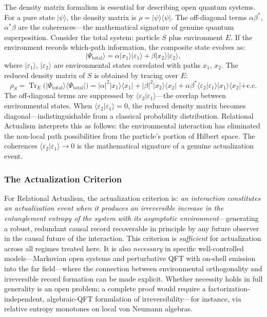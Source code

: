 \documentclass[11pt,a4paper]{article}
\theoremstyle{plain}
\theoremstyle{definition}
\theoremstyle{remark}
\newcommand{\ket}[1]{|#1\rangle}
\newcommand{\bra}[1]{\langle #1|}
\newcommand{\braket}[2]{\langle #1 | #2 \rangle}
\newcommand{\rhoS}{\rho_{S}}
\begin{document}
The density matrix formalism is essential for describing open quantum systems. For
a pure state $\ket{\psi}$, the density matrix is $\rho = \ket{\psi}\!\bra{\psi}$.
The off-diagonal terms $\alpha\beta^{*}$, $\alpha^{*}\beta$ are the
coherences---the mathematical signature of genuine quantum superposition. Consider
the total system: particle $S$ plus environment $E$. If the environment records
which-path information, the composite state evolves as:
\begin{equation}
  \ket{\Psi_{\mathrm{total}}} = \alpha\ket{x_1}\ket{\varepsilon_1}
  + \beta\ket{x_2}\ket{\varepsilon_2},
\end{equation}
where $\ket{\varepsilon_1}$, $\ket{\varepsilon_2}$ are environmental states
correlated with paths $x_1$, $x_2$. The reduced density matrix of $S$ is obtained
by tracing over $E$:
\begin{equation}
  \rhoS = \operatorname{Tr}_{E}\!\bigl(\ket{\Psi_{\mathrm{total}}}\!
           \bra{\Psi_{\mathrm{total}}}\bigr)
  = |\alpha|^2\ket{x_1}\!\bra{x_1}
  + |\beta|^2\ket{x_2}\!\bra{x_2}
  + \alpha\beta^{*}\braket{\varepsilon_2}{\varepsilon_1}\ket{x_1}\!\bra{x_2}
  + \mathrm{c.c.}
\end{equation}
The off-diagonal terms are suppressed by $\braket{\varepsilon_2}{\varepsilon_1}$---the
overlap between environmental states. When $\braket{\varepsilon_2}{\varepsilon_1}
= 0$, the reduced density matrix becomes diagonal---indistinguishable from a
classical probability distribution. Relational Actualism interprets this as
follows: the environmental interaction has eliminated the non-local path
possibilities from the particle's portion of Hilbert space. The coherences
$\braket{\varepsilon_2}{\varepsilon_1} \to 0$ is the mathematical signature of a
genuine actualization event.

\subsubsection{The Actualization Criterion}
\label{sec:criterion}

For Relational Actualism, the actualization criterion is: \emph{an interaction
constitutes an actualization event when it produces an irreversible increase in
the entanglement entropy of the system with its asymptotic environment}---generating
a robust, redundant causal record recoverable in principle by any future observer
in the causal future of the interaction. This criterion is \emph{sufficient} for
actualization across all regimes treated here. It is also \emph{necessary} in
specific well-controlled models---Markovian open systems and perturbative QFT with
on-shell emission into the far field---where the connection between environmental
orthogonality and irreversible record formation can be made explicit. Whether
necessity holds in full generality is an open problem; a complete proof would
require a factorization-independent, algebraic-QFT formulation of
irreversibility---for instance, via relative entropy monotones on local von Neumann
algebras.
\end{document}
